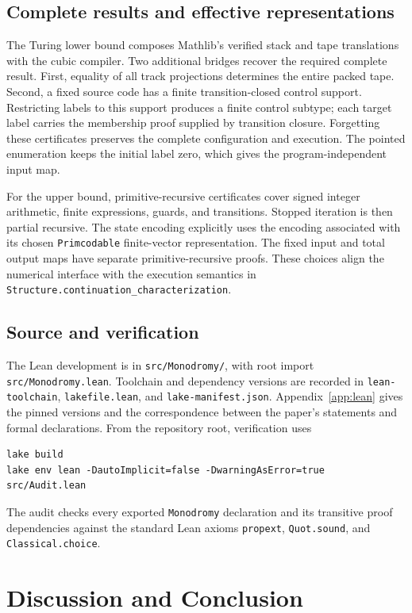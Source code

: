 \documentclass[11pt]{article}
\numberwithin{equation}{section}
\theoremstyle{definition}
\theoremstyle{remark}
\newcommand{\code}[1]{\nolinkurl{#1}}
\begin{document}
\subsection{Complete results and effective representations}

The Turing lower bound composes Mathlib's verified stack and tape
translations with the cubic compiler. Two additional bridges recover
the required complete result. First, equality of all track projections
determines the entire packed tape. Second, a fixed source code has
a finite transition-closed control support. Restricting labels to
this support produces a finite control subtype; each target label
carries the membership proof supplied by transition closure. Forgetting
these certificates preserves the complete configuration and execution.
The pointed enumeration keeps the initial label zero, which gives
the program-independent input map.

For the upper bound, primitive-recursive certificates cover signed
integer arithmetic, finite expressions, guards, and transitions.
Stopped iteration is then partial recursive. The state encoding
explicitly uses the encoding associated with its chosen
\code{Primcodable} finite-vector representation. The fixed input and
total output maps have separate primitive-recursive proofs. These
choices align the numerical interface with the execution semantics in
\code{Structure.continuation_characterization}.

\subsection{Source and verification}

The Lean development is in \code{src/Monodromy/}, with root import
\code{src/Monodromy.lean}. Toolchain and dependency versions are
recorded in \code{lean-toolchain}, \code{lakefile.lean}, and
\code{lake-manifest.json}.
Appendix~\ref{app:lean} gives the pinned versions and the correspondence
between the paper's statements and formal declarations. From the
repository root, verification uses
\begin{verbatim}
lake build
lake env lean -DautoImplicit=false -DwarningAsError=true src/Audit.lean
\end{verbatim}
The audit checks every exported \code{Monodromy} declaration and its
transitive proof dependencies against the standard Lean axioms
\code{propext}, \code{Quot.sound}, and \code{Classical.choice}.

\section{Discussion and Conclusion}
\label{sec:discussion}
\end{document}
